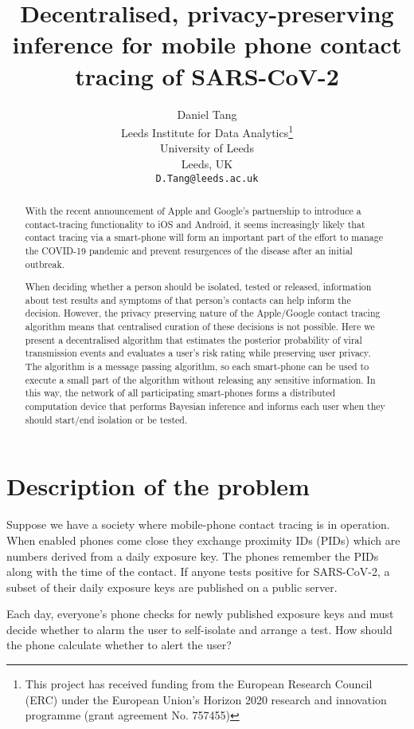 \documentclass{article}
\title{Decentralised, privacy-preserving inference for mobile phone contact tracing of SARS-CoV-2}
\author{
  Daniel Tang\\
  Leeds Institute for Data Analytics\thanks{This project has received funding from the European Research Council (ERC) under the European Union’s Horizon 2020 research and innovation programme (grant agreement No. 757455)}\\
  University of Leeds\\
  Leeds, UK\\
  \texttt{D.Tang@leeds.ac.uk} \\
}
\begin{document}
\maketitle

\begin{abstract}
With the recent announcement of Apple and Google's partnership to introduce a contact-tracing functionality to iOS and Android, it seems increasingly likely that contact tracing via a smart-phone will form an important part of the effort to manage the COVID-19 pandemic and prevent resurgences of the disease after an initial outbreak.

When deciding whether a person should be isolated, tested or released, information about test results and symptoms of that person's contacts can help inform the decision. However, the privacy preserving nature of the Apple/Google contact tracing algorithm means that centralised curation of these decisions is not possible. Here we present a decentralised algorithm that estimates the posterior probability of viral transmission events and evaluates a user's risk rating while preserving user privacy. The algorithm is a message passing algorithm, so each smart-phone can be used to execute a small part of the algorithm without releasing any sensitive information. In this way, the network of all participating smart-phones forms a distributed computation device that performs Bayesian inference and informs each user when they should start/end isolation or be tested. 

\end{abstract}


\section{Description of the problem}

Suppose we have a society where mobile-phone contact tracing is in operation. When enabled phones come close they exchange proximity IDs (PIDs) which are numbers derived from a daily exposure key. The phones remember the PIDs along with the time of the contact. If anyone tests positive for SARS-CoV-2, a subset of their daily exposure keys are published on a public server.

Each day, everyone's phone checks for newly published exposure keys and must decide whether to alarm the user to self-isolate and arrange a test. How should the phone calculate whether to alert the user?
\end{document}
